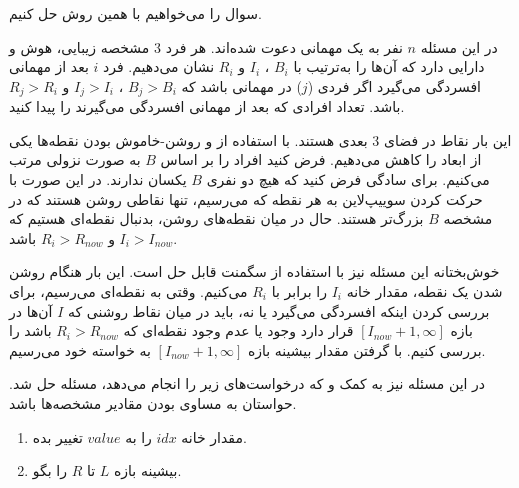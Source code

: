 \def\problemCode{\LR{Ball}}
\def\problemFarsiTitle{توپ}

\begin{problem}

  سوال
  \href{https://codeforces.com/problemset/problem/12/D}{}
  را می‌خواهیم با همین روش حل کنیم.
  
  در این مسئله 
  $n$
  نفر به یک مهمانی دعوت شده‌اند. هر فرد
  $3$
  مشخصه
  زیبایی،
  هوش و
  دارایی دارد که آن‌ها را به‌ترتیب با
  $B_i$
  ،
  $I_i$
  و
  $R_i$
  نشان می‌دهیم. فرد 
  $i$
  بعد از مهمانی افسردگی می‌گیرد اگر فردی
  ($j$)
  در مهمانی باشد که 
  $B_j > B_i$
  ،
  $I_j > I_i$
  و
  $R_j > R_i$
  باشد. تعداد افرادی که بعد از مهمانی افسردگی می‌گیرند را پیدا کنید.

  این بار نقاط در فضای
  $3$
  بعدی هستند. با استفاده از 
  و
  روشن-خاموش بودن نقطه‌ها یکی از ابعاد را کاهش می‌دهیم.
  فرض کنید افراد را بر اساس
  $B$
  به صورت نزولی مرتب می‌کنیم.
  برای سادگی فرض کنید که هیچ دو نفری 
  $B$
  یکسان ندارند.
  در این صورت با حرکت کردن
  سوییپ‌لاین به هر نقطه که می‌رسیم، تنها نقاطی روشن هستند که
  در مشخصه
  $B$
  بزرگ‌تر هستند. حال در میان نقطه‌های روشن، بدنبال نقطه‌ای هستیم که
  $I_i > I_{now}$
  و
  $R_i > R_{now}$
  باشد. 

  خوش‌بختانه این مسئله نیز با استفاده از سگمنت قابل حل است.
  این بار هنگام روشن شدن یک نقطه، مقدار خانه
  $I_i$
  را برابر با
  $R_i$
  می‌کنیم.
  وقتی به نقطه‌ای می‌رسیم، 
  برای بررسی کردن اینکه افسردگی می‌گیرد یا نه،
  باید در میان نقاط روشنی که 
  $I$
  آن‌ها در بازه
  $[I_{now} + 1, \infty]$
  قرار دارد وجود یا عدم وجود نقطه‌ای که
  $R_i > R_{now}$
  باشد را بررسی کنیم.
  با گرفتن مقدار بیشینه بازه
  $[I_{now} + 1, \infty]$
  به خواسته خود می‌رسیم.

  در این مسئله نیز به کمک
  و
  که درخواست‌های زیر را انجام می‌دهد، مسئله حل شد.
  حواستان به مساوی بودن مقادیر مشخصه‌ها باشد. 
  \begin{enumerate}
    \item
      مقدار خانه
      $idx$
      را به
      $value$
      تغییر بده.

    \item
      بیشینه بازه
      $L$
      تا
      $R$
      را بگو.
  \end{enumerate}

\end{problem}
